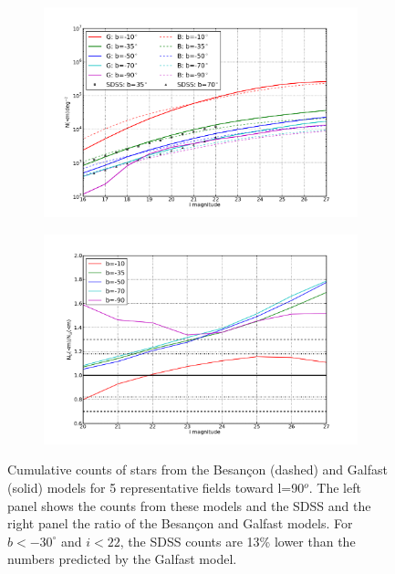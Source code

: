 \documentclass[11pt]{article}
\begin{document}


\begin{figure}[h]
\centering
\begin{subfigure}[b]{0.45\textwidth}
\includegraphics[width=\textwidth]{validation_figures/cumulative_stars_90_besancon_dust.png}
\end{subfigure}
\begin{subfigure}[b]{0.45\textwidth}
\centering
\includegraphics[width=\textwidth]{validation_figures/cumulative_ratio_stars_90_besancon_dust.png}
\end{subfigure}
\caption{Cumulative counts of stars from the Besan\c{c}on (dashed) and
  Galfast (solid) models for 5 representative fields toward
  l=90$^o$. The left panel shows the counts from these models and the
  SDSS and the right panel the ratio of the Besan\c{c}on and Galfast
  models. For $b<-30^{\circ}$ and $i<22$, the SDSS counts are 13\%
  lower than the numbers predicted by the Galfast model.}
\label{fig:scounts_90}
\label{fig:sratio_90}
  \end{figure}
\end{document}
